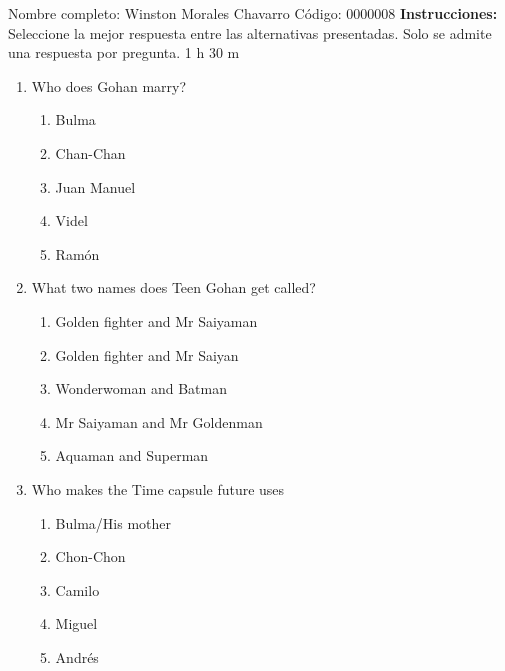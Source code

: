\documentclass[letterpaper,addpoints,answers,twocolumn,10pt]{exam}
\begin{document}
\noindent Nombre completo: Winston Morales Chavarro
\newline \newline \newline \newline
Código: 0000008\newline \newline 
{\bf Instrucciones:} Seleccione la mejor respuesta entre las alternativas presentadas. Solo se admite una respuesta por pregunta.
 1 h 30 m

\begin{enumerate}[leftmargin=.2in]




\item  Who does Gohan marry?


\begin{enumerate}[noitemsep,leftmargin=0in]


\item  Bulma
\item  Chan-Chan
\item  Juan Manuel
\item  Videl
\item  Ramón


\end{enumerate}



\item  What two names does Teen Gohan get called?


\begin{enumerate}[noitemsep,leftmargin=0in]


\item  Golden fighter and Mr Saiyaman
\item  Golden fighter and Mr Saiyan
\item  Wonderwoman and Batman
\item  Mr Saiyaman and Mr Goldenman
\item  Aquaman and Superman


\end{enumerate}



\item  Who makes the Time capsule future uses


\begin{enumerate}[noitemsep,leftmargin=0in]


\item  Bulma/His mother
\item  Chon-Chon
\item  Camilo
\item  Miguel
\item  Andrés



\end{enumerate}
\end{enumerate}
\end{document}
